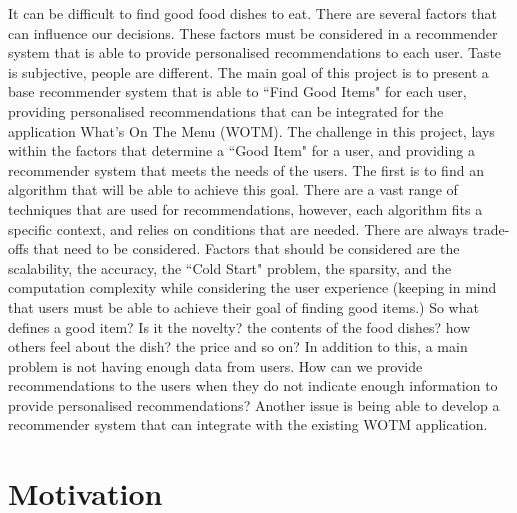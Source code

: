 It can be difficult to find good food dishes to eat. There are several factors that can influence our decisions. These factors must be considered in a recommender system that is able to provide personalised recommendations to each user. Taste is subjective, people are different.  The main goal of this project is to present a base recommender system that is able to ``Find Good Items" for each user, providing personalised recommendations that can be integrated for the application What's On The Menu (WOTM). The challenge in this project, lays within the factors that determine a ``Good Item" for a user, and providing a recommender system that meets the needs of the users. The first is to find an algorithm that will be able to achieve this goal. There are a vast range of techniques that are used for recommendations, however, each algorithm fits a specific context, and relies on conditions that are needed. There are always trade-offs that need to be considered. Factors that should be considered are the scalability, the accuracy, the ``Cold Start" problem, the sparsity, and the computation complexity while considering the user experience (keeping in mind that users must be able to achieve their goal of finding good items.) So what defines a good item? Is it the novelty? the contents of the food dishes? how others feel about the dish? the price and so on? In addition to this, a main problem is not having enough data from users. How can we provide recommendations to the users when they do not indicate enough information to provide personalised recommendations? Another issue is being able to develop a recommender system that can integrate with the existing WOTM application. 

\section{Motivation}

